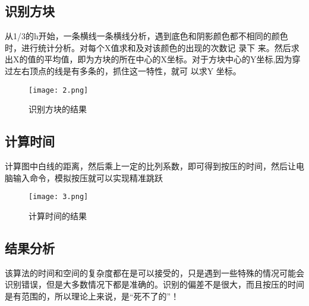 \documentclass[UTF8,10pt,twocolumn,letterpaper]{article}
\begin{document}
\subsection{识别方块}

从1/3的h开始，一条横线一条横线分析，遇到底色和阴影颜色都不相同的颜色时，进行统计分析。对每个X值求和及对该颜色的出现的次数记
录下
来。然后求出X的值的平均值，即为方块的所在中心的X坐标。对于方块中心的Y坐标,因为穿过左右顶点的线是有多条的，抓住这一特性，就可
以求Y
坐标。
\begin{figure}[t]
\begin{center}
   \texttt{[image: 2.png]}
\end{center}
   \caption{识别方块的结果}
\label{fig:long}
\label{fig:onecol}
\end{figure}

\subsection{计算时间}
计算图中白线的距离，然后乘上一定的比列系数，即可得到按压的时间，然后让电脑输入命令，模拟按压就可以实现精准跳跃
\begin{figure}[t]
\begin{center}
   \texttt{[image: 3.png]}
\end{center}
   \caption{计算时间的结果}
\label{fig:long}
\label{fig:onecol}
\end{figure}

\subsection{结果分析}

该算法的时间和空间的复杂度都在是可以接受的，只是遇到一些特殊的情况可能会识别错误，但是大多数情况下都是准确的。识别的偏差不是很大，而且按压的时间是有范围的，所以理论上来说，是“死不了的”！












{\small


}
\end{document}

